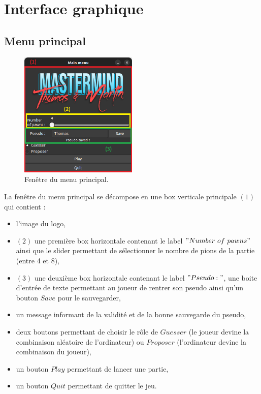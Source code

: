 
\section{Interface graphique}

\subsection{Menu principal}

\begin{figure}[htbp]
    \centering
    \includegraphics[width=0.5\textwidth]{main_menu.png}
    \caption{Fenêtre du menu principal.}
\end{figure}

La fenêtre du menu principal se décompose en une box verticale principale $(1)$ qui contient :
\begin{itemize}
    \item l'image du logo,
    \item $(2)$ une première box horizontale contenant le label $"Number~of~ pawns"$ ainsi que le slider permettant de sélectionner le nombre de pions de la partie (entre 4 et 8),
    \item $(3)$ une deuxième box horizontale contenant le label $"Pseudo:"$, une boite d'entrée de texte permettant au joueur de rentrer son pseudo ainsi qu'un bouton $Save$ pour le sauvegarder,
    \item un message informant de la validité et de la bonne sauvegarde du pseudo,
    \item deux boutons permettant de choisir le rôle de $Guesser$ (le joueur devine la combinaison aléatoire de l'ordinateur) ou $Proposer$ (l'ordinateur devine la combinaison du joueur),
    \item un bouton $Play$ permettant de lancer une partie,
    \item un bouton $Quit$ permettant de quitter le jeu.
\end{itemize}

